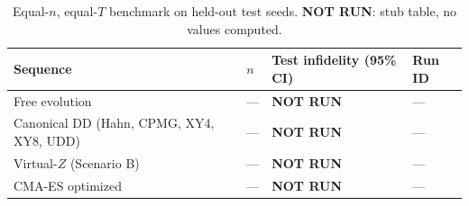 \begin{table}[t]
  \centering
  \caption{Equal-$n$, equal-$T$ benchmark on held-out test seeds. \textbf{NOT RUN}: stub table,
    no values computed.}
  \label{tab:benchmark}
  \begin{tabular}{@{}llll@{}}
    \toprule
    Sequence & $n$ & Test infidelity (95\% CI) & Run ID \\
    \midrule
    Free evolution    & --- & \textbf{NOT RUN} & --- \\
    Canonical DD (Hahn, CPMG, XY4, XY8, UDD) & --- & \textbf{NOT RUN} & --- \\
    Virtual-$Z$ (Scenario B) & --- & \textbf{NOT RUN} & --- \\
    CMA-ES optimized  & --- & \textbf{NOT RUN} & --- \\
    \bottomrule
  \end{tabular}
\end{table}
